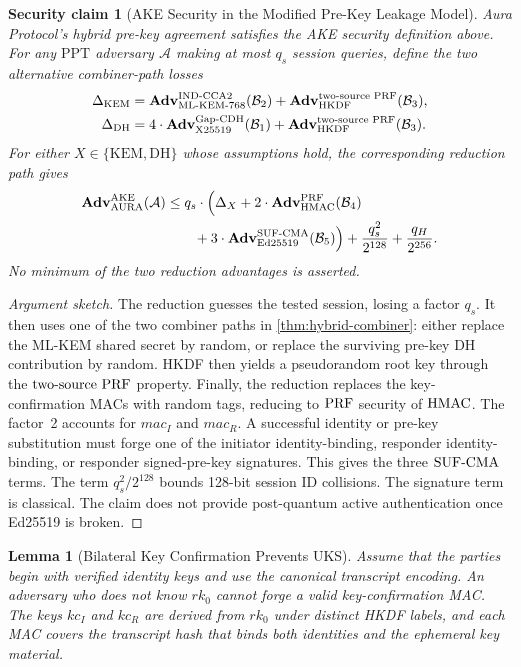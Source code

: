 \documentclass[preprint,12pt]{elsarticle}
\newtheorem{lemma}[theorem]{Lemma}
\newtheorem{securityclaim}[theorem]{Security claim}
\theoremstyle{definition}
\newcommand{\tech}[1]{\textnormal{#1}}
\renewcommand{\mathsf}[1]{\mathrm{#1}}
\newcommand{\ppt}{\mathrm{PPT}}
\newcommand{\adv}{\mathbf{Adv}}
\newcommand{\advA}{\mathcal{A}}
\newcommand{\advB}{\mathcal{B}}
\newcommand{\HKDF}{\tech{HKDF}}
\newcommand{\HMAC}{\tech{HMAC}}
\renewcommand{\DH}{\tech{X25519}}
\newcommand{\KEM}{\tech{ML-KEM-768}}
\newcommand{\GapCDH}{\tech{Gap-CDH}}
\newcommand{\INDCCA}{\tech{IND-CCA2}}
\newcommand{\PRF}{\tech{PRF}}
\newcommand{\SUFCMA}{\tech{SUF-CMA}}
\newcommand{\twoSourcePRF}{\tech{two-source PRF}}
\newcommand{\AKE}{\tech{AKE}}
\newcommand{\rk}{\mathit{rk}}
\begin{document}
\begin{securityclaim}[AKE Security in the Modified Pre-Key Leakage Model]\label{thm:ake}
Aura Protocol's hybrid pre-key agreement satisfies the AKE security definition above. For any
$\ppt$ adversary $\advA$ making at most $q_s$ session queries, define the two
alternative combiner-path losses
\begin{align*}
  \Delta_{\mathsf{KEM}}
  &= \adv^{\INDCCA}_{\KEM}(\advB_2)
     + \adv^{\twoSourcePRF}_{\HKDF}(\advB_3),\\
  \Delta_{\mathsf{DH}}
  &= 4\cdot\adv^{\GapCDH}_{\DH}(\advB_1)
     + \adv^{\twoSourcePRF}_{\HKDF}(\advB_3).
\end{align*}
For either $X\in\{\mathsf{KEM},\mathsf{DH}\}$ whose assumptions hold, the
corresponding reduction path gives
\begin{align}
  \adv^{\AKE}_{\mathrm{AURA}}(\advA)
  &\leq q_s \cdot \Bigl(
    \Delta_X + 2 \cdot \adv^{\PRF}_{\HMAC}(\advB_4) \notag\\
  &\qquad
    + 3 \cdot \adv^{\SUFCMA}_{\mathrm{Ed25519}}(\advB_5)\Bigr)
    + \frac{q_s^2}{2^{128}} + \frac{q_H}{2^{256}}. \label{eq:ake-bound}
\end{align}
No minimum of the two reduction advantages is asserted.
\end{securityclaim}

\begin{proof}[Argument sketch]
The reduction guesses the tested session, losing a factor $q_s$. It then uses
one of the two combiner paths in \cref{thm:hybrid-combiner}: either replace the
ML-KEM shared secret by random, or replace the surviving pre-key DH contribution by
random. HKDF then yields a pseudorandom root key through the $\twoSourcePRF$
property. Finally, the reduction replaces the key-confirmation MACs with random
tags, reducing to $\PRF$ security of $\HMAC$. The factor~2 accounts for
$\mathit{mac}_I$ and $\mathit{mac}_R$. A successful identity or pre-key
substitution must forge one of the initiator identity-binding, responder
identity-binding, or responder signed-pre-key signatures. This gives the three
$\SUFCMA$ terms. The term $q_s^2/2^{128}$ bounds 128-bit session ID collisions.
The signature term is classical. The claim does not provide post-quantum active
authentication once Ed25519 is broken.
\end{proof}

\begin{lemma}[Bilateral Key Confirmation Prevents UKS]\label{lem:key-confirm}
Assume that the parties begin with verified identity keys and use the canonical
transcript encoding. An adversary who does not know $\rk_0$ cannot forge a valid
key-confirmation MAC. The keys $\mathit{kc}_I$ and $\mathit{kc}_R$ are derived
from $\rk_0$ under distinct HKDF labels, and each MAC covers the transcript hash
that binds both identities and the ephemeral key material.
\end{lemma}
\end{document}
